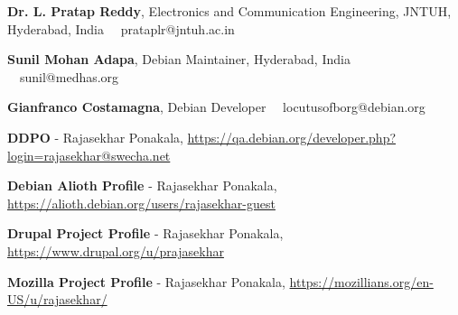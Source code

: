 \begin{cventries}
    \cventry{}{}{}{}
    {
    \begin{cvlist}
        \item {\textbf{Dr. L. Pratap Reddy}, Electronics and Communication Engineering, JNTUH, Hyderabad, India \hspace{1ex} \faEnvelope\ \ prataplr@jntuh.ac.in}
        \item {\textbf{Sunil Mohan Adapa}, Debian Maintainer, Hyderabad, India \hspace{1ex} \faEnvelope\ \ sunil@medhas.org}
        \item {\textbf{Gianfranco Costamagna}, Debian Developer \hspace{1ex} \faEnvelope\ \ locutusofborg@debian.org}
        \item {\textbf{DDPO} - Rajasekhar Ponakala, \url{https://qa.debian.org/developer.php?login=rajasekhar@swecha.net}}
        \item {\textbf{Debian Alioth Profile} - Rajasekhar Ponakala, \url{https://alioth.debian.org/users/rajasekhar-guest}}
        \item {\textbf{Drupal Project Profile} - Rajasekhar Ponakala, \url{https://www.drupal.org/u/prajasekhar}}
        \item {\textbf{Mozilla Project Profile} - Rajasekhar Ponakala, \url{https://mozillians.org/en-US/u/rajasekhar/}}
      \end{cvlist}
    }
\end{cventries}
